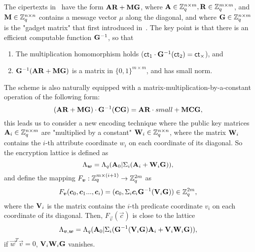 The cipertexts in~ \cite{PKC:HirAbeOka15} have the form $\mathbf{AR}+\mathbf{MG}$, where $\mathbf{A}\in \mathbb{Z}^{n \times m}_{q}, \mathbf{R}\in \mathbb{Z}^{m \times m}_{q}$, and $\mathbf{M}\in \mathbb{Z}^{n \times n}_{q}$ contains a message vector $\mu$ along the diagonal, and where $\mathbf{G}\in \mathbb{Z}^{n \times m}_{q}$ is the "gadget matrix" that first introduced in~\cite{EC:MicPei12}. The key point is that there is an efficient computable function $\mathbf{G}^{-1}$, so that
\begin{enumerate}
\item The multiplication homomorphism holds ($\mathsf{ct}_{1}\cdot \mathbf{G}^{-1}(\mathsf{ct}_{2})=\mathsf{ct}_{\times}$), and
\item $\mathbf{G}^{-1}(\mathbf{AR}+\mathbf{MG})$ is a matrix in $\{0,1\}^{m \times m}$, and has small norm.
\end{enumerate}
The scheme is also naturally equipped with a matrix-multiplication-by-a-constant operation of the following form:
$$(\mathbf{AR}+\mathbf{MG})\cdot \mathbf{G}^{-1}(\mathbf{CG})=\mathbf{AR}\cdot small+\mathbf{MCG},$$
this leads us to consider a new encoding technique where the public key matrices $\mathbf{A}_{i}\in \mathbb{Z}^{n \times m}_{q}$ are "multiplied by a constant" $\mathbf{W}_{i}\in \mathbb{Z}^{n \times n}_{q}$, where the matrix $\mathbf{W}_{i}$ contains the $i$-th attribute coordinate $w_{i}$ on each coordinate of its diagonal. So the encryption lattice is defined as
$$ \Lambda_{\boldsymbol{w}}=\Lambda_{q}(\mathbf{A}_{0}|\Sigma_{i} (\mathbf{A}_{i}+\mathbf{W}_{i}\mathbf{G})),$$
and define the mapping $F_{\boldsymbol{v}}: \mathbb{Z}^{m \times (i+1)}_{q} \rightarrow \mathbb{Z}^{2m}_{q}$ as
$$ F_{\boldsymbol{v}}(\boldsymbol{c}_{0},\boldsymbol{c}_{1}...,\boldsymbol{c}_{i})=(\boldsymbol{c}_{0},\Sigma_{i}\boldsymbol{c}_{i}\mathbf{G}^{-1}(\mathbf{V}_{i}\mathbf{G}))\in \mathbb{Z}^{2m}_{q},$$
where the $\mathbf{V}_{i}$ is the matrix contains the $i$-th predicate coordinate $v_{i}$ on each coordinate of its diagonal. Then, $F_{\vec{v}}(\vec{c})$ is close to the lattice
$$ \Lambda_{\boldsymbol{v},\boldsymbol{w}}=\Lambda_{q}(\mathbf{A}_{0}|\Sigma_{i}(\mathbf{G}^{-1}(\mathbf{V}_{i}\mathbf{G})\mathbf{A}_{i}+\mathbf{V}_{i}\mathbf{W}_{i}\mathbf{G})),$$
if $\vec{w}^{T}\vec{v}=0$, $\mathbf{V}_{i}\mathbf{W}_{i}\mathbf{G}$ vanishes.\

